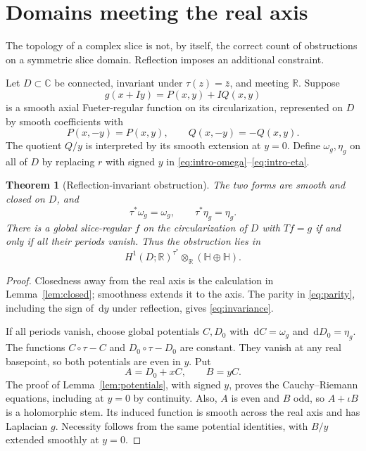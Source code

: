 \documentclass[11pt,a4paper]{article}
\numberwithin{equation}{section}
\newtheorem{theorem}{Theorem}[section]
\theoremstyle{definition}
\theoremstyle{remark}
\newcommand{\R}{\mathbb R}
\newcommand{\C}{\mathbb C}
\newcommand{\HH}{\mathbb H}
\newcommand{\ic}{\iota}
\newcommand{\dd}{\,\mathrm d}
\begin{document}
\section{Domains meeting the real axis}
\label{sec:real}

The topology of a complex slice is not, by itself, the correct count of
obstructions on a symmetric slice domain. Reflection imposes an additional
constraint.

Let $D\subset\C$ be connected, invariant under $\tau(z)=\bar z$, and meeting
$\R$. Suppose
\[
 g(x+Iy)=P(x,y)+I Q(x,y)
\]
is a smooth axial Fueter-regular function on its circularization, represented
on $D$ by smooth coefficients with
\begin{equation}
 P(x,-y)=P(x,y),\qquad Q(x,-y)=-Q(x,y).
 \label{eq:parity}
\end{equation}
The quotient $Q/y$ is interpreted by its smooth extension at $y=0$.
Define $\omega_g,\eta_g$ on all of $D$ by replacing $r$ with signed $y$ in
\eqref{eq:intro-omega}--\eqref{eq:intro-eta}.

\begin{theorem}[Reflection-invariant obstruction]\label{thm:reflection}
The two forms are smooth and closed on $D$, and
\begin{equation}
 \tau^*\omega_g=\omega_g,\qquad \tau^*\eta_g=\eta_g.
 \label{eq:invariance}
\end{equation}
There is a global slice-regular $f$ on the circularization of $D$ with
$Tf=g$ if and only if all their periods vanish. Thus the obstruction lies in
\begin{equation}
 H^1(D;\R)^{\tau^*}\otimes_\R(\HH\oplus\HH).
 \label{eq:invariant-cohomology}
\end{equation}
\end{theorem}
\begin{proof}
Closedness away from the real axis is the calculation in
Lemma~\ref{lem:closed}; smoothness extends it to the axis. The parity in
\eqref{eq:parity}, including the sign of $\dd y$ under reflection, gives
\eqref{eq:invariance}.

If all periods vanish, choose global potentials $C,D_0$ with
$\dd C=\omega_g$ and $\dd D_0=\eta_g$. The functions $C\circ\tau-C$ and
$D_0\circ\tau-D_0$ are constant. They vanish at any real basepoint, so both
potentials are even in $y$. Put
\[
 A=D_0+xC,\qquad B=yC.
\]
The proof of Lemma~\ref{lem:potentials}, with signed $y$, proves the
Cauchy--Riemann equations, including at $y=0$ by continuity. Also, $A$ is even
and $B$ odd, so $A+\ic B$ is a holomorphic stem. Its induced function is
smooth across the real axis and has Laplacian $g$. Necessity follows from the
same potential identities, with $B/y$ extended smoothly at $y=0$.
\end{proof}
\end{document}
